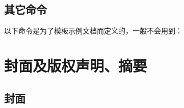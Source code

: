 \subsection*{其它命令}

以下命令是为了模板示例文档而定义的，一般不会用到：
\begin{latex}
\TeXLive   %
\htuthesis %
\version   %
\end{latex}

\section{封面及版权声明、摘要}
\label{sec:cover}

\subsection*{封面}

